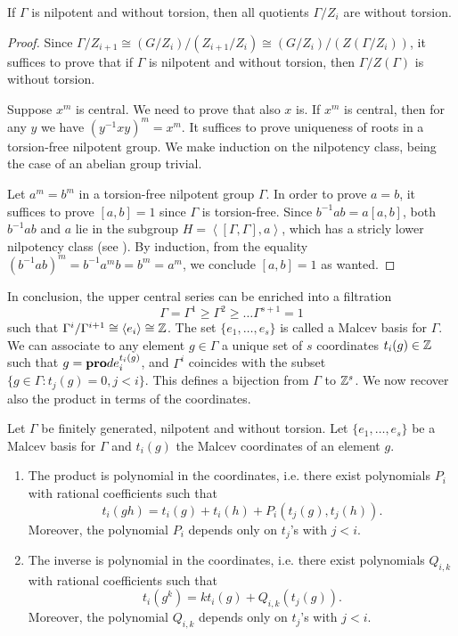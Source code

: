 \begin{lemma}
If $\Gamma$ is nilpotent and without torsion, then all quotients $\Gamma/Z_i$ are without torsion.
\end{lemma}

\begin{proof}
Since $\Gamma/Z_{i+1}\cong({G/Z_i})/({Z_{i+1}/Z_i})\cong({G/Z_i})/({Z(\Gamma/Z_i)})$, it suffices to prove that if $\Gamma$ is nilpotent and without torsion, then $\Gamma/Z(\Gamma)$ is without torsion. 

Suppose $x^m$ is central. We need to prove that also $x$ is. If $x^m$ is central, then for any $y$ we have $(y^{-1}xy)^m=x^m$. It suffices to prove uniqueness of roots in a torsion-free nilpotent group. We make induction on the nilpotency class, being the case of an abelian group trivial.

Let $a^m=b^m$ in a torsion-free nilpotent group $\Gamma$. In order to prove $a=b$, it suffices to prove $[a,b]=1$ since $\Gamma$ is torsion-free. Since $b^{-1}ab=a[a,b]$, both $b^{-1}ab$ and $a$ lie in the subgroup $H=\left\langle [\Gamma,\Gamma],a\right\rangle$, which has a stricly lower nilpotency class (see \cite[Proposition 2.5.5]{suisse}). By induction, from the equality $(b^{-1}ab)^m=b^{-1}a^mb=b^m=a^m$, we conclude $[a,b]=1$ as wanted.
\end{proof}

In conclusion, the upper central series can be enriched into a filtration 
\[
\Gamma=\Gamma^1\geq\Gamma^2\geq\ldots\Gamma^{s+1}=1
\]
such that $\Gamma^i/\Gamma^{i+1}\cong\left\langle e_i\right\rangle\cong\mathbb{Z}$. The set $\{e_1,\ldots,e_s\}$ is called a Malcev basis for $\Gamma$. We can associate to any element $g\in\Gamma$ a unique set of $s$ coordinates $t_i(g)\in\mathbb{Z}$ such that $g={\bf{pro}}d e_i^{t_i(g)}$, and $\Gamma^i$ coincides with the subset $\{g\in\Gamma: t_j(g)=0, j<i\}$. This defines a bijection from $\Gamma$ to $\mathbb{Z}^s$. We now recover also the product in terms of the coordinates.

\begin{prop}
Let $\Gamma$ be finitely generated, nilpotent and without torsion. Let $\{e_1,\ldots,e_s\}$ be a Malcev basis for $\Gamma$ and $t_i(g)$ the Malcev coordinates of an element $g$.
\begin{enumerate}
	\item The product is polynomial in the coordinates, i.e. there exist polynomials $P_{i}$ with rational coefficients such that
	\[t_i(gh)=t_i(g)+t_i(h)+P_{i}(t_j(g),t_j(h)).\]
	Moreover, the polynomial $P_{i}$ depends only on $t_j$'s with $j<i$.
	\item The inverse is polynomial in the coordinates, i.e. there exist polynomials $Q_{i,k}$ with rational coefficients such that
	\[t_i(g^k)=kt_i(g)+Q_{i,k}(t_j(g)).\]
	Moreover, the polynomial $Q_{i,k}$ depends only on $t_j$'s with $j<i$.
\end{enumerate}
\end{prop}

